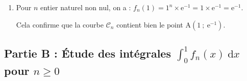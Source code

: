 \documentclass[10pt]{article}
\providecommand{\e}{{\mathrm{e}}}
\begin{document}
\begin{enumerate}
\begin{enumerate}
$\bullet~$$f_n(n) = n^{n}\times \e^{-n} = n^n \times \dfrac{1}{\e^n} = \left(\dfrac{n}{\e}\right)^n $;

Enfin, calculons la limite de $f_n$ quand $x$ tend vers $+\infty$ :

$\forall x \in ]0~;~+\infty[,\quad f_n(x) = x^{n}\e^{-x} = \dfrac{x^{n}}{\e^{x}} = \dfrac{1}{~\dfrac{\e^{x}}{x^{n}}}$

La propriété des croissances comparées dit que, pour tout $n$ naturel non nul :\quad $\lim\limits_{x \to +\infty} \dfrac{\e^{x}}{x^n} = +\infty$;

Par limite du quotient, on en déduit :\quad $ \lim\limits_{x \to +\infty} f_n(x) = \lim\limits_{x \to+\infty} \dfrac{1}{~\dfrac{\e^{x}}{x^{n}}~} = 0$.

La courbe $\mathcal{C}_n$ admet donc une asymptote horizontale d'équation $y = 0$ au voisinage de $+\infty$.

On a ainsi justifié tous les éléments de ce tableau de variations.
	\end{enumerate}

\item Pour $n$ entier naturel non nul, on a : \quad $f_n(1) = 1^{n}\times \e^{-1} = 1\times \e^{-1} = \e^{-1}$.

Cela confirme que la courbe $\mathcal{C}_n$ contient bien le point A$\left(1~;~\e^{-1}\right)$.
\end{enumerate}

\subsection*{Partie B : Étude des intégrales \quad \boldmath$\displaystyle \int_{0}^{1}f_n(x) ~\mathrm{d}x$\unboldmath \quad pour \quad \boldmath$n \geqslant 0$\unboldmath}
\end{document}
